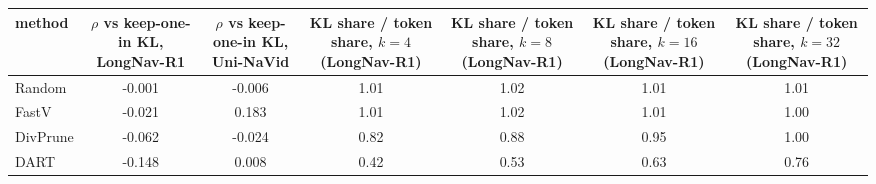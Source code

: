 \begin{tabular}{lcccccc}
\toprule
method & $\rho$ vs keep-one-in KL, LongNav-R1 & $\rho$ vs keep-one-in KL, Uni-NaVid & KL share / token share, $k{=}4$ (LongNav-R1) & KL share / token share, $k{=}8$ (LongNav-R1) & KL share / token share, $k{=}16$ (LongNav-R1) & KL share / token share, $k{=}32$ (LongNav-R1) \\
\midrule
Random & -0.001 & -0.006 & 1.01 & 1.02 & 1.01 & 1.01 \\
FastV & -0.021 & 0.183 & 1.01 & 1.02 & 1.01 & 1.00 \\
DivPrune & -0.062 & -0.024 & 0.82 & 0.88 & 0.95 & 1.00 \\
DART & -0.148 & 0.008 & 0.42 & 0.53 & 0.63 & 0.76 \\
\bottomrule
\end{tabular}
